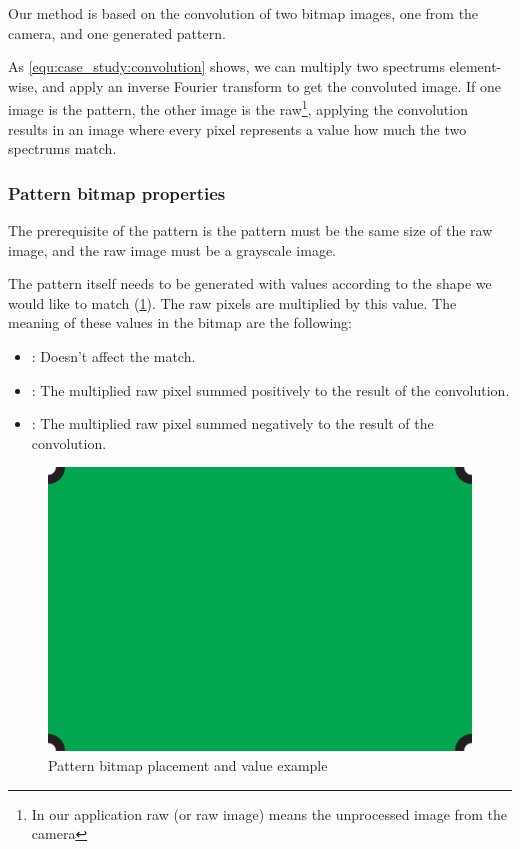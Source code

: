 Our method is based on the convolution of two bitmap images, one from the camera, and one generated pattern.

As \cref{equ:case_study:convolution} shows, we can multiply two spectrums element-wise, and apply an inverse Fourier transform to get the convoluted image. If one image is the pattern, the other image is the raw\footnote{In our application raw (or raw image) means the unprocessed image from the camera}, applying the convolution results in an image where every pixel represents a value how much the two spectrums match.

\subsubsection{Pattern bitmap properties}

The prerequisite of the pattern is the pattern must be the same size of the raw image, and the raw image must be a grayscale image.

The pattern itself needs to be generated with values according to the shape we would like to match (\cref{fig:case_study:convoluter_image}). The raw pixels are multiplied by this value. The meaning of these values in the bitmap are the following: 
\begin{itemize}
	\item {}: Doesn't affect the match.
	\item {}: The multiplied raw pixel summed positively to the result of the convolution.
	\item {}: The multiplied raw pixel summed negatively to the result of the convolution.
\end{itemize}

\begin{figure}[h]
	\centering
	\includegraphics[valign=c,width=.65\linewidth]{include/figures/chapter_6/math_2}
	\caption{Pattern bitmap placement and value example}
	\label{fig:case_study:convoluter_image}
\end{figure}

